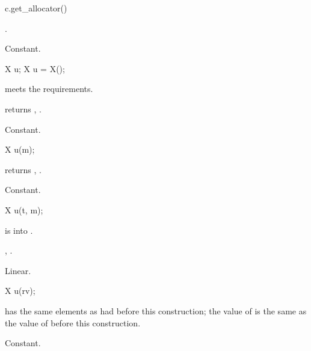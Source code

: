 %
\begin{itemdecl}
c.get_allocator()
\end{itemdecl}

\begin{itemdescr}
\pnum
\result
{}.

\pnum
\complexity
Constant.
\end{itemdescr}

\begin{itemdecl}
X u;
X u = X();
\end{itemdecl}

\begin{itemdescr}
\pnum
\expects
{} meets the  requirements.

\pnum
\ensures
{} returns , .

\pnum
\complexity
Constant.
\end{itemdescr}

\begin{itemdecl}
X u(m);
\end{itemdecl}

\begin{itemdescr}
\pnum
\ensures
{} returns , .

\pnum
\complexity
Constant.
\end{itemdescr}

\begin{itemdecl}
X u(t, m);
\end{itemdecl}

\begin{itemdescr}
\pnum
\expects
{} is  into .

\pnum
\ensures
{}, .

\pnum
\complexity
Linear.
\end{itemdescr}

\begin{itemdecl}
X u(rv);
\end{itemdecl}

\begin{itemdescr}
\pnum
\ensures
{} has the same elements as  had before this construction;
the value of  is the same as
the value of  before this construction.

\pnum
\complexity
Constant.
\end{itemdescr}

